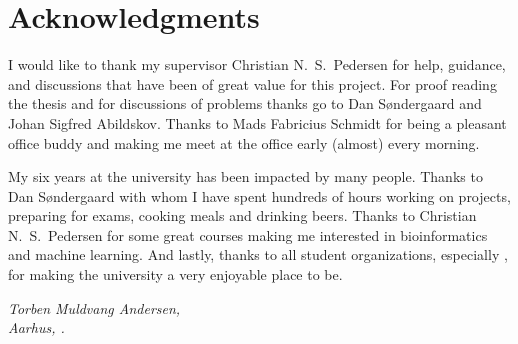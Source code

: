 \chapter*{Acknowledgments}

I would like to thank my supervisor Christian N.\ S.\ Pedersen for help,
guidance, and discussions that have been of great value for this project. For
proof reading the thesis and for discussions of problems thanks go to Dan
Søndergaard and Johan Sigfred Abildskov. Thanks to Mads Fabricius Schmidt for
being a pleasant office buddy and making me meet at the office early (almost)
every morning.

My six years at the university has been impacted by many people. Thanks to Dan
Søndergaard with whom I have spent hundreds of hours working on projects,
preparing for exams, cooking meals and drinking beers. Thanks to Christian N.\
S.\ Pedersen for some great courses making me interested in bioinformatics and
machine learning. And lastly, thanks to all student organizations, especially
\TKET{}, for making the university a very enjoyable place to be.

\vspace{2ex}
\begin{flushright}
  \emph{Torben Muldvang Andersen,}\\
  \emph{Aarhus, .}
\end{flushright}

